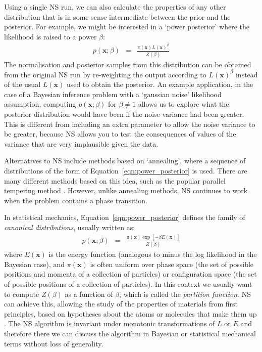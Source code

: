 \documentclass[journal,article,accept,moreauthors,pdftex,12pt,a4paper]{mdpi}
\newcommand{\xx}{\boldsymbol{x}}
\begin{document}
Using a single NS run, we can also calculate the properties of any other distribution that
is in some sense intermediate
between the prior and the posterior. For example, we might be interested in
a `power posterior' where the likelihood is raised to a power $\beta$:
\begin{eqnarray}
p(\xx; \beta) &=& \frac{\pi(\xx)L(\xx)^\beta}{Z(\beta)}\label{eqn:power_posterior}
\end{eqnarray}
The normalisation and posterior samples from this distribution can be obtained
from the original NS run by re-weighting the output according to $L(\xx)^\beta$
instead of the usual $L(\xx)$ used to obtain the posterior.
An example application, in the case of
a Bayesian inference problem with a `gaussian noise' likelihood assumption,
computing $p(\xx; \beta)$ for $\beta \neq 1$ allows us to explore what the
posterior distribution would have been if the noise variance had been greater.
This is different from including an extra parameter to allow the noise variance
to be greater, because NS allows you to test the consequences of values of the
variance that are very implausible given the data.

Alternatives to NS include methods based on `annealing', where a sequence of
distributions of the form of Equation~\ref{eqn:power_posterior} is used.
There are many different methods based on this idea, such as the popular
parallel tempering method \citep{pt}.
However, unlike annealing methods, NS continues
to work when the problem contains a phase transition.

In statistical mechanics, Equation~\ref{eqn:power_posterior} defines the
family of {\it canonical distributions}, usually written as:
\begin{eqnarray}
p(\xx; \beta) &=& \frac{\pi(\xx)\exp[-\beta E(\xx)]}{Z(\beta)}
\end{eqnarray}
where $E(\xx)$ is the energy function (analogous to minus the log likelihood
in the Bayesian case), and $\pi(\xx)$ is often uniform over
phase space (the set of possible positions and momenta of a collection of
particles) or configuration space (the set of possible positions of a collection
of particles). In this context we usually want to
compute $Z(\beta)$ as a function of $\beta$, which is called the
{\it partition function}. NS can achieve this, allowing the study of
the properties of materials from first principles, based on hypotheses about
the atoms or molecules that make them up \citep[e.g.][]{2009arXiv0906.3544P,
2014PhRvE..89b2302P, 2015arXiv150303404B}. The NS algorithm is invariant under
monotonic transformations of $L$ or $E$ and therefore there we can discuss the
algorithm in Bayesian or statistical mechanical terms without loss of
generality.
\end{document}
